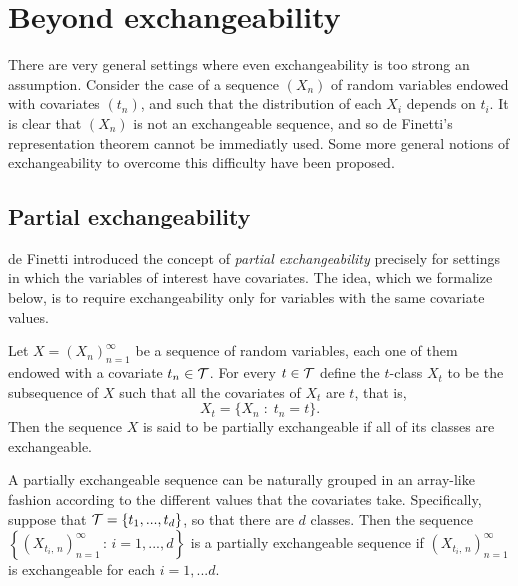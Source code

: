 

\section{Beyond exchangeability} \label{section:exchangeability}




There are very general settings where even exchangeability is too strong an assumption. Consider the case of a sequence $(X_n)$ of random variables endowed with covariates $(t_n)$, and such that the distribution of each $X_i$ depends on $t_i$. It is clear that $(X_n)$ is not an exchangeable sequence, and so de Finetti's representation theorem cannot be immediatly used. Some more general notions of exchangeability to overcome this difficulty have been proposed.



\subsection{Partial exchangeability}


de Finetti \cite{deFinetti:1938:partial_exch} introduced the concept of \textit{partial exchangeability} precisely for settings in which the variables of interest have covariates. The idea, which we formalize below, is to require exchangeability only for variables with the same covariate values.

\begin{definition} \label{def:partial_exchangeability}
	Let $X = (X_n)_{n=1}^{\infty}$ be a sequence of random variables, each one of them endowed with a covariate $t_n \in \mathcal{T}$. For every $t \in \mathcal{T}$ define the $t$-class $X_t$ to be the subsequence of $X$ such that all the covariates of $X_t$ are $t$, that is,
	\begin{equation*}
		X_t = \{ X_n \; : \; t_n = t \}.
	\end{equation*}
	Then the sequence $X$ is said to be partially exchangeable if all of its classes are exchangeable.
\end{definition}

A partially exchangeable sequence can be naturally grouped in an array-like fashion according to the different values that the covariates take. Specifically, suppose that $\mathcal{T} = \{t_1, ..., t_d \}$, so that there are $d$ classes. Then the sequence $\left\{ (X_{t_i, \, n})_{n=1}^{\infty} \, : \, i=1, ..., d \right\}$ is a partially exchangeable sequence if $(X_{t_i, \, n})_{n=1}^{\infty}$ is exchangeable for each $i=1, ...d$. \\

